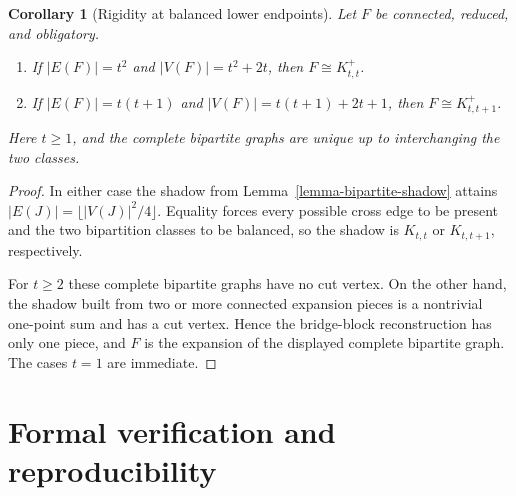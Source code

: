 \documentclass[a4paper,11pt,reqno]{amsart}
\theoremstyle{plain}
\newtheorem{corollary}[theorem]{Corollary}
\theoremstyle{definition}
\theoremstyle{remark}
\begin{document}
\begin{corollary}[Rigidity at balanced lower endpoints]
\label{corollary-balanced-endpoint-rigidity}
Let $F$ be connected, reduced, and obligatory.
\begin{enumerate}
\item If $|E(F)|=t^2$ and $|V(F)|=t^2+2t$, then
$F\cong K_{t,t}^+$.
\item If $|E(F)|=t(t+1)$ and $|V(F)|=t(t+1)+2t+1$, then
$F\cong K_{t,t+1}^+$.
\end{enumerate}
Here $t\ge1$, and the complete bipartite graphs are unique up to interchanging
the two classes.
\end{corollary}
\begin{proof}
In either case the shadow from Lemma~\ref{lemma-bipartite-shadow} attains
$|E(J)|=\lfloor|V(J)|^2/4\rfloor$.  Equality forces every possible cross edge
to be present and the two bipartition classes to be balanced, so the shadow is
$K_{t,t}$ or $K_{t,t+1}$, respectively.

For $t\ge2$ these complete bipartite graphs have no cut vertex.  On the other
hand, the shadow built from two or more connected expansion pieces is a
nontrivial one-point sum and has a cut vertex.  Hence the bridge-block
reconstruction has only one piece, and $F$ is the expansion of the displayed
complete bipartite graph.  The cases $t=1$ are immediate.
\end{proof}

\section*{Formal verification and reproducibility}
\end{document}
